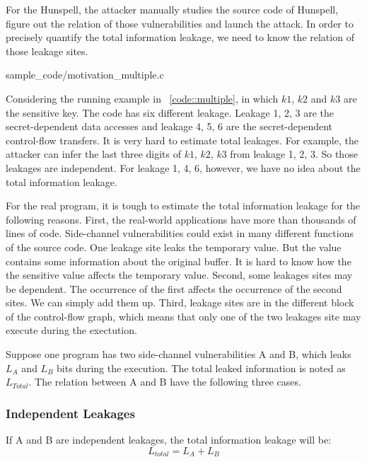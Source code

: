 For the Hunspell, the attacker manually studies the source code of Hunspell, figure out
the relation of those vulnerabilities and launch the attack. In order to precisely quantify the
total information leakage, we need to know the relation of those leakage sites. 


                 {sample_code/motivation_multiple.c}

Considering the running example in ~\ref{code::multiple}, in which $k1$, $k2$ and $k3$ are
the sensitive key. The code has six different leakage. Leakage 1, 2, 3 are the secret-dependent
data accesses and leakage 4, 5, 6 are the secret-dependent control-flow transfers. It is
very hard to estimate total leakages. For example, the attacker can infer the last three digits of
$k1$, $k2$, $k3$ from leakage 1, 2, 3. So those leakages are independent. For leakage 1, 4, 6, however,
we have no idea about the total information leakage.

For the real program, it is tough to estimate the total information leakage for the following reasons.
First, the real-world applications have more than thousands of lines of code. Side-channel vulnerabilities
could exist in many different functions of the source code. One leakage site leaks the temporary value. 
But the value contains some information about the original buffer. It is hard to know how the 
the sensitive value affects the temporary value. Second, some leakages sites may be
dependent. The occurrence of the first affects the occurrence of the second sites. We 
can simply add them up. Third, leakage sites are in the different block of the 
control-flow graph, which means that only one of the two leakages site may execute
during the exectution.

Suppose one program has two side-channel vulnerabilities A and B, which leaks $L_A$ and $L_B$ bits
during the execution. The total leaked information is noted as $L_{Total}$. The relation between
A and B have the following three cases. 

\subsubsection{Independent Leakages}
If A and B are independent leakages, the total information leakage will be:
\begin{displaymath}
\label{independent leakage}
    L_{total} = L_A + L_B 
\end{displaymath} 

